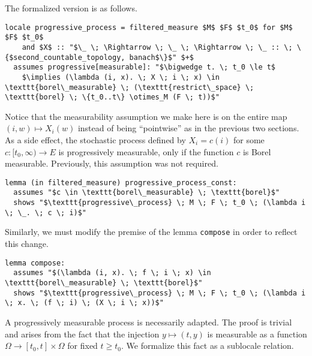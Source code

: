 The formalized version is as follows.

\begin{isadefinition}
{\small
\begin{lstlisting}[style=isabelle]
locale progressive_process = filtered_measure $M$ $F$ $t_0$ for $M$ $F$ $t_0$
	and $X$ :: "$\_ \; \Rightarrow \; \_ \; \Rightarrow \; \_ :: \; \{$second_countable_topology, banach$\}$" $+$
  assumes progressive[measurable]: "$\bigwedge t. \; t_0 \le t$
	$\implies (\lambda (i, x). \; X \; i \; x) \in \texttt{borel\_measurable} \; (\texttt{restrict\_space} \; \texttt{borel} \; \{t_0..t\} \otimes_M (F \; t))$"
\end{lstlisting}
}
\end{isadefinition}

Notice that the measurability assumption we make here is on the entire map $(i, w) \mapsto X_i(w)$ instead of being ``pointwise'' as in the previous two sections. As a side effect, the stochastic process defined by $X_i = c(i)$ for some $c : [t_0, \infty) \rightarrow E$ is progressively measurable, only if the function $c$ is Borel measurable. Previously, this assumption was not required.

\begin{isalemma}
{\small
\begin{lstlisting}[style=isabelle]
lemma (in filtered_measure) progressive_process_const:
  assumes "$c \in \texttt{borel\_measurable} \; \texttt{borel}$"
  shows "$\texttt{progressive\_process} \; M \; F \; t_0 \; (\lambda i \; \_. \; c \; i)$"
  \end{lstlisting}
}
\end{isalemma}

Similarly, we must modify the premise of the lemma \texttt{compose} in order to reflect this change.

\begin{isalemma}
{\small
\begin{lstlisting}[style=isabelle]
lemma compose:
  assumes "$(\lambda (i, x). \; f \; i \; x) \in \texttt{borel\_measurable} \; \texttt{borel}$"
  shows "$\texttt{progressive\_process} \; M \; F \; t_0 \; (\lambda i \; x. \; (f \; i) \; (X \; i \; x))$"
  \end{lstlisting}
}
\end{isalemma}

A progressively measurable process is necessarily adapted. The proof is trivial and arises from the fact that the injection $y \mapsto (t, y)$ is measurable as a function $\Omega \rightarrow [t_0, t] \times \Omega$ for fixed $t \ge t_0$. We formalize this fact as a sublocale relation.

